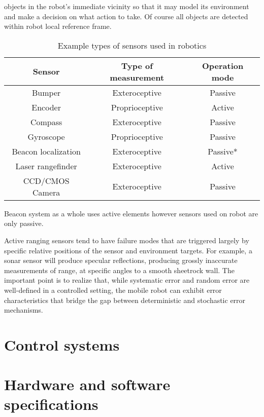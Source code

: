 objects in the robot’s immediate vicinity so that it may model its environment and make a 
decision on what action to take. Of course all objects are detected within robot local reference 
frame. 
\begin{table}[htb] 
	\centering
	\caption{Example types of sensors used in robotics}
	\label{tab:robot-sensors}
	\begin{tabular}{ccc}
		\hline
		\hline
		Sensor& Type of measurement& Operation mode\\
		\hline
		Bumper&  Exteroceptive& Passive\\
		Encoder& Proprioceptive& Active\\
		Compass& Exteroceptive& Passive\\
		Gyroscope& Proprioceptive& Passive\\
		Beacon localization& Exteroceptive& Passive*\\
		Laser rangefinder& Exteroceptive& Active\\
		CCD/CMOS Camera& Exteroceptive& Passive\\
		\hline
		\hline
	\end{tabular}
	\newline
	{\footnotesize *Beacon system as a whole uses active elements however sensors 
	used on robot are only passive.}
\end{table}
Active ranging sensors tend to have failure modes that are triggered largely by specific 
relative positions of the sensor and environment targets. For example, a sonar sensor will
produce specular reflections, producing grossly inaccurate measurements of range,
at specific angles to a smooth sheetrock wall.  The important point is to realize that, while 
systematic error and random error are well-defined in a controlled setting, the mobile robot can
exhibit error characteristics that bridge the gap between deterministic and stochastic error
mechanisms.



\FloatBarrier
\section{Control systems}

\FloatBarrier
\section{Hardware and software specifications}
